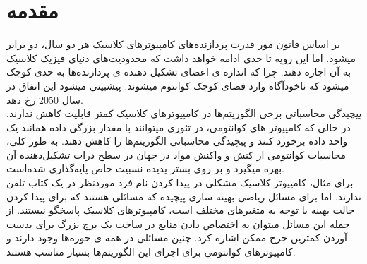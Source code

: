\chapter{مقدمه}
بر اساس قانون مور
قدرت پردازنده‌های کامپیوترهای کلاسیک هر دو سال، دو برابر میشود. اما این رویه تا حدی ادامه خواهد داشت که محدودیت‌های دنیای فیزیک کلاسیک به آن اجازه دهند. چرا که اندازه ی اعضای تشکیل دهنده ی پردازنده‌ها به حدی کوچک میشود که ناخودآگاه وارد فضای کوچک کوانتوم
 میشوند. پیشبینی میشود این اتفاق در سال 2050 رخ دهد.
\\
 پیچیدگی محاسباتی
 برخی الگوریتم‌ها در کامپیوترهای کلاسیک کمتر قابلیت کاهش ندارند. در حالی که کامپیوتر های کوانتومی، در تئوری میتوانند با مقدار بزرگی داده همانند یک واحد داده برخورد کنند و پیچیدگی محاسباتی الگوریتم‌ها را کاهش دهند.
\cite{singhbook1in2}
به طور کلی، محاسبات کوانتومی از کنش و واکنش مواد در جهان در سطح ذرات تشکیل‌دهنده آن بهره میگیرد و بر روی بستر پدیده نسبیت خاص
 پایه‌گذاری شده‌است. 
\\
برای مثال، کامپیوتر کلاسیک مشکلی در پیدا کردن نام فرد موردنظر در یک کتاب تلفن ندارند. اما برای مسائل ریاضی بهینه سازی پیچیده
  که مسائلی هستند که برای پیدا کردن حالت بهینه با توجه به متغیرهای مختلف است، کامپیوترهای کلاسیک پاسخگو نیستند. از جمله این مسائل میتوان به اختصاص دادن منابع در ساخت یک برج بزرگ برای بدست آوردن کمترین خرج ممکن اشاره کرد.  چنین مسائلی در همه ی حوزه‌ها وجود دارند و کامپیوترهای کوانتومی برای اجرای این الگوریتم‌ها بسیار مناسب هستند. 
‌\cite{singhbook1in4}

